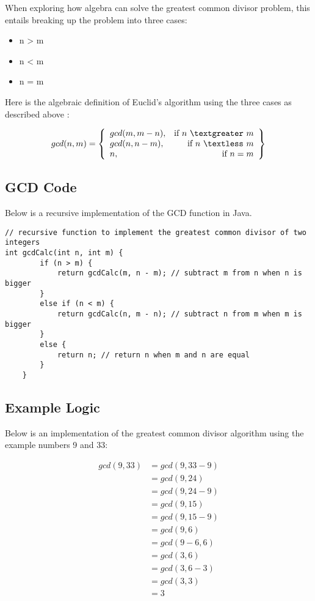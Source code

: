 \documentclass{article}
\theoremstyle{theorem}
\theoremstyle{definition}
\theoremstyle{remark}
\begin{document}
When exploring how algebra can solve the greatest common divisor problem, this entails breaking up the problem into three cases: 

\begin{itemize}
\item n \textgreater \text{} m
\item n \textless \text{} m
\item n = m
\end{itemize}

Here is the algebraic definition of Euclid's algorithm using the three cases as described above \cite{Ltx}: 

\begin{equation}
gcd (n, m) = 
\left\{
    \begin{array}{lr}
        gcd(m, m - n), & \text{if } n \text{ } \textgreater \text{ } m\\
        gcd(n, n - m), & \text{if } n \text{ } \textless \text{ } m\\
        n, & \text{if } n = m
    \end{array}
\right\}
\end{equation}

\subsection{GCD Code}

Below is a recursive implementation of the GCD function in Java. 

\begin{lstlisting}
// recursive function to implement the greatest common divisor of two integers
int gcdCalc(int n, int m) {
        if (n > m) {
            return gcdCalc(m, n - m); // subtract m from n when n is bigger 
        }
        else if (n < m) {
            return gcdCalc(n, m - n); // subtract n from m when m is bigger
        }
        else {
            return n; // return n when m and n are equal 
        }
    }
\end{lstlisting}

\subsection{Example Logic}

Below is an implementation of the greatest common divisor algorithm using the example numbers 9 and 33:

\begin{align}
gcd(9, 33) & = gcd(9, 33-9)\\
& = gcd(9, 24)\\
& = gcd(9, 24-9)\\
& = gcd(9, 15)\\
& = gcd(9, 15-9)\\
& = gcd(9, 6)\\
& = gcd(9-6, 6)\\
& = gcd(3, 6)\\
& = gcd(3, 6-3)\\
& = gcd(3, 3)\\
& = 3
\end{align}
\end{document}
